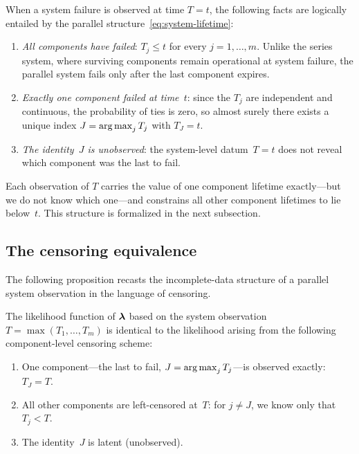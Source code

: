When a system failure is observed at time $T = t$, the following facts
are logically entailed by the parallel structure~\eqref{eq:system-lifetime}:

\begin{enumerate}
  \item[(i)] \emph{All components have failed}: $T_j \leq t$ for every
    $j = 1, \ldots, m$.  Unlike the series system, where surviving
    components remain operational at system failure, the parallel system
    fails only after the last component expires.

  \item[(ii)] \emph{Exactly one component failed at time~$t$}: since the
    $T_j$ are independent and continuous, the probability of ties is zero,
    so almost surely there exists a unique index
    $J = \operatorname*{arg\,max}_{j} T_j$ with $T_J = t$.

  \item[(iii)] \emph{The identity~$J$ is unobserved}: the system-level
    datum~$T = t$ does not reveal which component was the last to fail.
\end{enumerate}

\noindent
Each observation of $T$ carries the value of one component
lifetime exactly---but we do not know which one---and constrains all other
component lifetimes to lie below~$t$.  This structure is formalized in the
next subsection.

\subsection{The censoring equivalence}
\label{sec:censoring-equiv}

The following proposition recasts the incomplete-data structure of a parallel
system observation in the language of censoring.

\begin{proposition}\label{prop:censoring-equiv}
  The likelihood function of $\boldsymbol{\lambda}$ based on the system observation
  $T = \max(T_1, \ldots, T_m)$ is identical to the likelihood arising
  from the following component-level censoring scheme:
  \begin{enumerate}
    \item[\textup{(a)}] One component---the last to fail,
      $J = \operatorname*{arg\,max}_j T_j$---is observed exactly: $T_J = T$.
    \item[\textup{(b)}] All other components are left-censored at~$T$: for
      $j \neq J$, we know only that $T_j < T$.
    \item[\textup{(c)}] The identity~$J$ is latent (unobserved).
  \end{enumerate}
\end{proposition}

